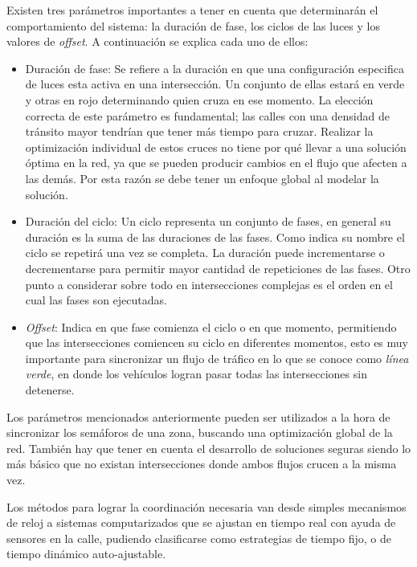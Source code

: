 Existen tres parámetros importantes a tener en cuenta que determinarán el comportamiento del sistema: la duración de fase, los ciclos de las luces y los valores de \emph{offset}. 
A continuación se explica cada uno de ellos:


\begin{itemize}
 	\item Duración de fase: Se refiere a la duración en que una configuración especifica de luces esta activa en una intersección. Un conjunto de ellas estará en verde y otras en rojo determinando quien cruza en ese momento. La elección correcta de este parámetro es fundamental; las calles con una densidad de tránsito mayor tendrían que tener más tiempo para cruzar. Realizar la optimización individual de estos cruces no tiene por qué llevar a una solución óptima en la red, ya que se pueden producir cambios en el flujo que afecten a las demás. Por esta razón se debe tener un enfoque global al modelar la solución.
 	
 	\item Duración del ciclo: Un ciclo representa un conjunto de fases, en general su duración es la suma de las duraciones de las fases. Como indica su nombre el ciclo se repetirá una vez se completa. La duración puede incrementarse o decrementarse para permitir mayor cantidad de repeticiones de las fases. Otro punto a considerar sobre todo en intersecciones complejas es el orden en el cual las fases son ejecutadas.
 	
 	\item \emph{Offset}: Indica en que fase comienza el ciclo o en que momento, permitiendo que las intersecciones comiencen su ciclo en diferentes momentos, esto es muy importante para sincronizar un flujo de tráfico en lo que se conoce como \emph{línea verde}, en donde los vehículos logran pasar todas las intersecciones sin detenerse.
\end{itemize}

Los parámetros mencionados anteriormente pueden ser utilizados a la hora de sincronizar los semáforos de una zona, buscando una optimización global de la red. También hay que tener en cuenta el desarrollo de soluciones seguras siendo lo más básico que no existan intersecciones donde ambos flujos crucen a la misma vez.

Los métodos para lograr la coordinación necesaria van desde simples mecanismos de reloj a sistemas computarizados que se ajustan en tiempo real con ayuda de sensores en la calle, pudiendo clasificarse como estrategias de tiempo fijo, o de tiempo dinámico auto-ajustable.

